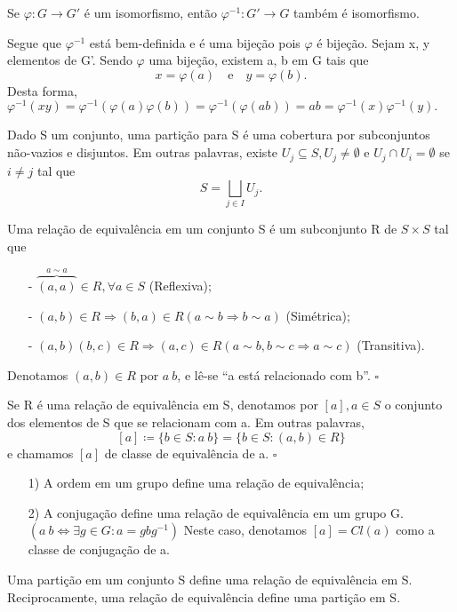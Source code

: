 \documentclass[Algebra/algebra_notes.tex]{subfiles}
\begin{document}
\begin{lemma*}
	Se $\varphi:G\rightarrow G'$ é um isomorfismo, então $\varphi^{-1}:G'\rightarrow G$ também é isomorfismo.
\end{lemma*}
\begin{proof*}
	Segue que $\varphi^{-1}$ está bem-definida e é uma bijeção pois $\varphi$ é bijeção. Sejam x, y elementos de G'.
	Sendo $\varphi$ uma bijeção, existem a, b em G tais que
	$$
		x = \varphi(a)\quad\text{e}\quad y = \varphi(b).
	$$
	Desta forma, $\varphi^{-1}(xy) = \varphi^{-1}(\varphi(a)\varphi(b)) = \varphi^{-1}(\varphi(ab)) = ab = \varphi^{-1}(x)\varphi^{-1}(y).$ \qedsymbol
\end{proof*}
\begin{def*}
	Dado S um conjunto, uma partição para S é uma cobertura por subconjuntos não-vazios e disjuntos. Em outras palavras,
	existe $U_{j}\subseteq{S}, U_{j}\neq\emptyset$ e $U_{j}\cap U_{i} = \emptyset$ se $i\neq j$ tal que
	$$
		S = \bigsqcup_{j\in I}U_{j}.
	$$
\end{def*}
\begin{def*}
	Uma relação de equivalência em um conjunto S é um subconjunto R de $S\times S$ tal que
	\begin{itemize}
		\item[-]$\overbrace{(a, a)}^{a\sim a}\in R, \forall a\in S$ (Reflexiva);
		\item[-]$(a, b)\in R \Rightarrow (b, a)\in R (a\sim b \Rightarrow b\sim a)$ (Simétrica);
		\item[-]$(a, b)(b, c)\in R \Rightarrow (a, c)\in R (a\sim b, b\sim c \Rightarrow a\sim c)$ (Transitiva).
	\end{itemize}
	Denotamos $(a, b)\in R$ por $a~b$, e lê-se ``a está relacionado com b''. $\square$
\end{def*}
\begin{def*}
	Se R é uma relação de equivalência em S, denotamos por $[a], a\in S$ o conjunto dos elementos de S que se relacionam com a. Em outras palavras,
	$$
		[a]\coloneqq\{b\in S: a~b\} = \{b\in S: (a, b)\in R\}
	$$
	e chamamos $[a]$ de classe de equivalência de a. $\square$
\end{def*}
\begin{example*}
	\begin{itemize}
		\item[1)] A ordem em um grupo define uma relação de equivalência;
		\item[2)] A conjugação define uma relação de equivalência em um grupo G. $(a~b \Longleftrightarrow \exists g\in G: a = gbg^{-1})$
		      Neste caso, denotamos $[a] = Cl(a)$ como a classe de conjugação de a.
	\end{itemize}
\end{example*}
\begin{theorem*}
	Uma partição em um conjunto S define uma relação de equivalência em S. Reciprocamente, uma relação de
	equivalência define uma partição em S.
\end{theorem*}
\end{document}
